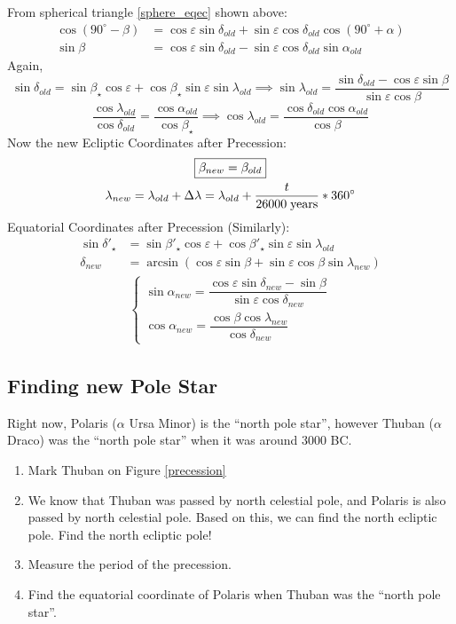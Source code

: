 \documentclass[a4paper,12pt]{extarticle}
\begin{document}
From spherical triangle \ref{sphere_eqec} shown above:
\begin{align*}
	\cos(90^\circ-\beta)&=\cos\varepsilon \sin\delta_{old}+\sin\varepsilon\cos\delta_{old}\cos(90^\circ+\alpha)\\
	\sin\beta&=\cos\varepsilon \sin\delta_{old}-\sin\varepsilon\cos\delta_{old}\sin\alpha_{old}
\end{align*}
Again, 
\[	\sin\delta_{old} =\sin \beta_\star \cos\varepsilon+\cos\beta_\star \sin\varepsilon \sin\lambda_{old} \implies \sin\lambda_{old}=\frac{\sin\delta_{old}-\cos\varepsilon \sin\beta}{\sin\varepsilon \cos\beta}\]
\[	\frac{\cos \lambda_{old} }{\cos \delta_{old}}=\frac{\cos\alpha_{old}}{\cos\beta_\star} \implies 
\cos\lambda_{old}=\frac{\cos\delta_{old}\cos\alpha_{old}}{\cos\beta}\]
Now the new Ecliptic Coordinates after Precession: 
   \begin{gather*}
	\boxed{\beta_{new} =\beta_{old}}\\
	\lambda_{new}=\lambda_{old}+\Delta \lambda= \lambda_{old}+\frac{t}{26000\;\rm years}\ast 360^\circ
\end{gather*}
Equatorial Coordinates after Precession (Similarly):
\begin{align*}
	\sin\delta'_\star&=\sin\beta'_\star\cos\varepsilon+\cos\beta'_\star \sin \varepsilon \sin\lambda_{old}\\		\delta_{new}&=\arcsin(\cos\varepsilon\sin\beta+\sin\varepsilon\cos\beta \sin\lambda_{new})
\end{align*}
\begin{gather*}
	\begin{cases}
		\sin\alpha_{new}=\dfrac{\cos\varepsilon\sin\delta_{new}-\sin\beta}{\sin\varepsilon\cos\delta_{new}}\\
		\cos\alpha_{new}=\dfrac{\cos\beta\cos\lambda_{new}}{\cos\delta_{new}}
	\end{cases}
\end{gather*}	


\subsection*{Finding new Pole Star}
Right now, Polaris ($\alpha$ Ursa Minor) is the ``north pole star'', however Thuban ($\alpha$ Draco) was the ``north pole star'' when it was around 3000 BC.

\begin{enumerate}[Q1.]
	\itemsep0em 
	\item Mark Thuban on Figure \ref{precession}
	\item We know that Thuban was passed by north celestial pole, and Polaris is also passed by north celestial pole. Based on this, we can find the north ecliptic pole. Find the north ecliptic pole!
	\item Measure the period of the precession.
	\item Find the equatorial coordinate of Polaris when Thuban was the ``north pole star''.
\end{enumerate}
\end{document}
